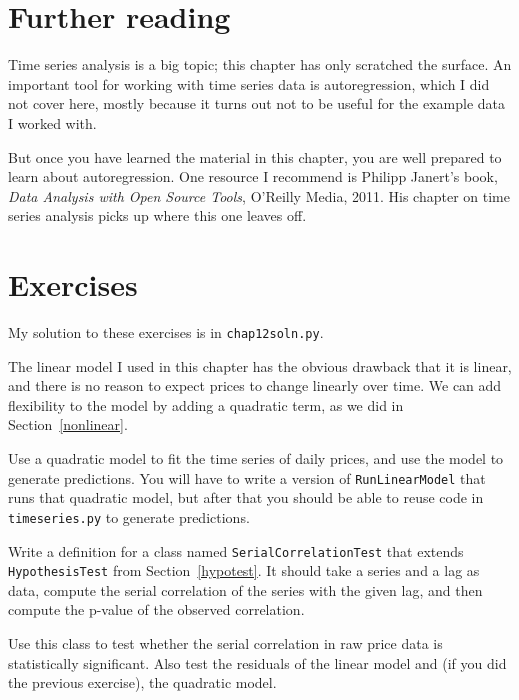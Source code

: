 \documentclass[12pt]{book}
\begin{document}
\section{Further reading}

Time series analysis is a big topic; this chapter has only scratched
the surface.  An important tool for working with time series data
is autoregression, which I did not cover here, mostly because it turns
out not to be useful for the example data I worked with.

But once you
have learned the material in this chapter, you are well prepared
to learn about autoregression.  One resource I recommend is
Philipp Janert's book, {\it Data Analysis with Open Source Tools},
O'Reilly Media, 2011.  His chapter on time series analysis picks up
where this one leaves off.


\section{Exercises}

My solution to these exercises is in \verb"chap12soln.py".

\begin{exercise}
The linear model I used in this chapter has the obvious drawback
that it is linear, and there is no reason to expect prices to
change linearly over time.
We can add flexibility to the model by adding a quadratic term,
as we did in Section~\ref{nonlinear}.  

Use a quadratic model to fit the time series of daily prices,
and use the model to generate predictions.  You will have to
write a version of {\tt RunLinearModel} that runs that quadratic
model, but after that you should be able to reuse code in
{\tt timeseries.py} to generate predictions.

\end{exercise}

\begin{exercise}
Write a definition for a class named {\tt SerialCorrelationTest}
that extends {\tt HypothesisTest} from Section~\ref{hypotest}.
It should take a series and a lag as data, compute the serial
correlation of the series with the given lag, and then compute
the p-value of the observed correlation.

Use this class to test whether the serial correlation in raw
price data is statistically significant.  Also test the residuals
of the linear model and (if you did the previous exercise),
the quadratic model.
   

\end{exercise}
\end{document}
